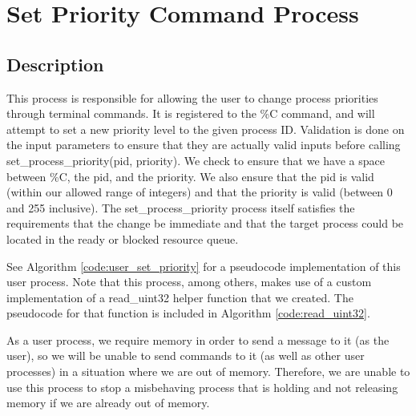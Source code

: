\documentclass[12pt]{report}
\begin{document}
\chapter{Set Priority Command Process}

\section{Description}
    This process is responsible for allowing the user to change process
    priorities through terminal commands.  It is registered to the \%C command,
    and will attempt to set a new priority level to the given process ID.
    Validation is done on the input parameters to ensure that they are actually
    valid inputs before calling set\_process\_priority(pid, priority).  We check
    to ensure that we have a space between \%C, the pid, and the priority.  We
    also ensure that the pid is valid (within our allowed range of integers) and
    that the priority is valid (between 0 and 255 inclusive).  The
    set\_process\_priority process itself satisfies the requirements that the
    change be immediate and that the target process could be located in the
    ready or blocked resource queue.

    See Algorithm \ref{code:user_set_priority} for a pseudocode implementation
    of this user process.  Note that this process, among others, makes use of
    a custom implementation of a read\_uint32 helper function that we created.
    The pseudocode for that function is included in Algorithm
    \ref{code:read_uint32}.

    As a user process, we require memory in order to send a message to it (as
    the user), so we will be unable to send commands to it (as well as other
    user processes) in a situation where we are out of memory.  Therefore, we
    are unable to use this process to stop a misbehaving process that is holding
    and not releasing memory if we are already out of memory.
\end{document}
